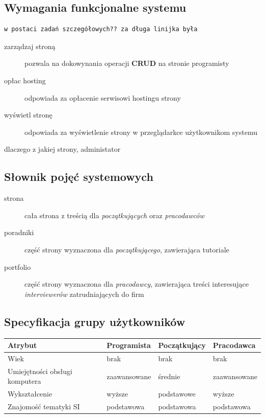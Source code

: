 \documentclass[11pt]{article}
\begin{document}
\subsection{Wymagania funkcjonalne systemu}
\label{sec:org814aa83}
\begin{verbatim}
w postaci zadań szczegółowych?? za długa linijka była
\end{verbatim}

\begin{description}
\item[{zarządzaj stroną}] pozwala na dokowynania operacji \textbf{CRUD} na stronie programisty
\item[{opłac hosting}] odpowiada za opłacenie serwisowi hostingu strony
\item[{wyświetl stronę}] odpowiada za wyświetlenie strony w przeglądarkce użytkownikom systemu
\end{description}
dlaczego z jakiej strony, administator
\subsection{Słownik pojęć systemowych}
\label{sec:org590a595}
\begin{description}
\item[{strona}] cała strona z treścią dla \emph{początkujących} oraz \emph{pracodawców}
\item[{poradniki}] część strony wyznaczona dla \emph{początkującego}, zawierająca tutoriale
\item[{portfolio}] część strony wyznaczona dla \emph{pracodawcy}, zawierająca treści interesujące \emph{interviewerów} zatrudniających do firm
\end{description}
\subsection{Specyfikacja grupy użytkowników}
\label{sec:orge0ef0b4}
\begin{center}
\begin{tabular}{llll}
Atrybut & Programista & Początkujący & Pracodawca\\
\hline
Wiek & brak & brak & brak\\
Umiejętności obsługi komputera & zaawansowane & średnie & zaawansowane\\
Wykształcenie & wyższe & podstawowe & wyższe\\
Znajomość tematyki SI & podstawowa & podstawowa & podstawowa\\
\end{tabular}
\end{center}
\end{document}
